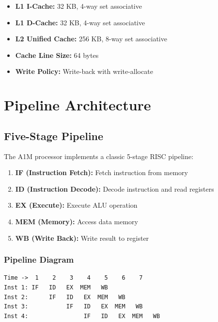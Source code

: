 \documentclass[12pt,a4paper,oneside]{book}
\begin{document}
\begin{itemize}
    \item \textbf{L1 I-Cache:} 32 KB, 4-way set associative
    \item \textbf{L1 D-Cache:} 32 KB, 4-way set associative
    \item \textbf{L2 Unified Cache:} 256 KB, 8-way set associative
    \item \textbf{Cache Line Size:} 64 bytes
    \item \textbf{Write Policy:} Write-back with write-allocate
\end{itemize}

\chapter{Pipeline Architecture}

\section{Five-Stage Pipeline}

The A1M processor implements a classic 5-stage RISC pipeline:

\begin{enumerate}
    \item \textbf{IF (Instruction Fetch):} Fetch instruction from memory
    \item \textbf{ID (Instruction Decode):} Decode instruction and read registers
    \item \textbf{EX (Execute):} Execute ALU operation
    \item \textbf{MEM (Memory):} Access data memory
    \item \textbf{WB (Write Back):} Write result to register
\end{enumerate}

\subsection{Pipeline Diagram}

\begin{verbatim}
Time ->  1    2    3    4    5    6    7
Inst 1: IF   ID   EX  MEM   WB
Inst 2:      IF   ID   EX  MEM   WB
Inst 3:           IF   ID   EX  MEM   WB
Inst 4:                IF   ID   EX  MEM   WB
\end{verbatim}
\end{document}
